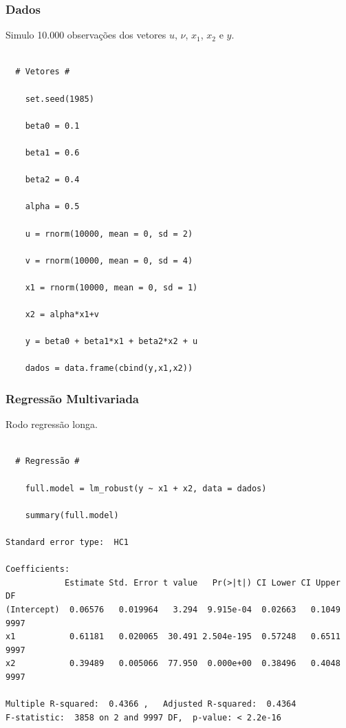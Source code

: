 \documentclass[10pt,slides,xcolor=pdftex,dvipsnames,table]{beamer}
\begin{document}
\begin{frame}[fragile]
	\frametitle{Dados}

\vspace{0.5cm}
Simulo 10.000 observações dos vetores $u$, $\nu$, $x_1$, $x_2$ e $y$.

\begin{lstlisting}

  # Vetores # 
    
	set.seed(1985)
   
	beta0 = 0.1

	beta1 = 0.6
   
	beta2 = 0.4
 
	alpha = 0.5
   
	u = rnorm(10000, mean = 0, sd = 2)
 
	v = rnorm(10000, mean = 0, sd = 4)

	x1 = rnorm(10000, mean = 0, sd = 1)
 
	x2 = alpha*x1+v
 
	y = beta0 + beta1*x1 + beta2*x2 + u
  
	dados = data.frame(cbind(y,x1,x2))

\end{lstlisting}

\end{frame}


\begin{frame}[fragile]
	\frametitle{Regressão Multivariada}

\vspace{0.5cm}
Rodo regressão longa.

\begin{lstlisting}

  # Regressão # 
    
	full.model = lm_robust(y ~ x1 + x2, data = dados)
	
	summary(full.model)

Standard error type:  HC1 

Coefficients:
            Estimate Std. Error t value   Pr(>|t|) CI Lower CI Upper   DF
(Intercept)  0.06576   0.019964   3.294  9.915e-04  0.02663   0.1049 9997
x1           0.61181   0.020065  30.491 2.504e-195  0.57248   0.6511 9997
x2           0.39489   0.005066  77.950  0.000e+00  0.38496   0.4048 9997

Multiple R-squared:  0.4366 ,	Adjusted R-squared:  0.4364 
F-statistic:  3858 on 2 and 9997 DF,  p-value: < 2.2e-16

\end{lstlisting}

\end{frame}
\end{document}
